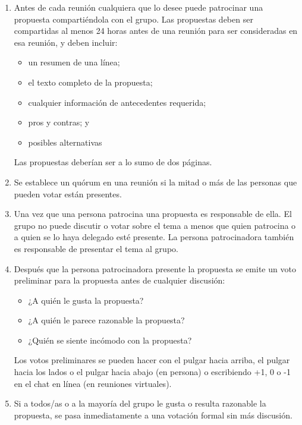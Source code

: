 \begin{enumerate}

\item
  Antes de cada reunión
  cualquiera que lo desee puede patrocinar una propuesta compartiéndola con el grupo.
  Las propuestas deben ser compartidas al menos 24 horas antes de una reunión para ser consideradas en esa reunión,
  y deben incluir:
  \begin{itemize}
  \item un resumen de una línea;
  \item el texto completo de la propuesta;
  \item cualquier información de antecedentes requerida;
  \item pros y contras; y
  \item posibles alternativas
  \end{itemize}
  Las propuestas deberían ser a lo sumo de dos páginas.

\item
  Se establece un quórum en una reunión si la mitad o más de las personas
  que pueden votar están presentes.

\item
  Una vez que una persona patrocina una propuesta
  es responsable de ella.
  El grupo no puede discutir o votar sobre el tema a menos que quien patrocina o 
  a quien se lo haya delegado esté presente.
  La persona patrocinadora también es responsable de presentar el tema al grupo.

\item
  Después que la persona patrocinadora presente la propuesta
  se emite un voto preliminar para la propuesta antes de cualquier discusión:
  \begin{itemize}
  \item ¿A quién le gusta la propuesta?
  \item ¿A quién le parece razonable la propuesta?
  \item ¿Quién se siente incómodo con la propuesta?
  \end{itemize}
  Los votos preliminares se pueden hacer con el pulgar hacia arriba, 
  el pulgar hacia los lados o el pulgar hacia abajo (en persona)
  o escribiendo +1, 0 o -1 en el chat en línea (en reuniones virtuales).

\item
  Si a todos/as o a la mayoría del grupo le gusta o resulta razonable la propuesta,
  se pasa inmediatamente a una votación formal sin más discusión.


\end{enumerate}
